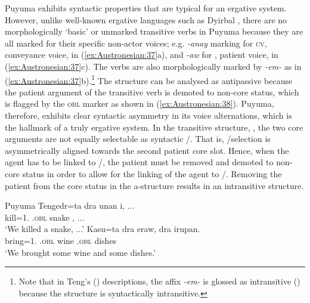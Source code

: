 \documentclass[output=paper,chinesefont]{../langscibook}
\begin{document}
Puyuma exhibits syntactic properties that are typical for an ergative system. However, unlike well-known ergative languages such as Dyirbal \citep{Dixon72}, there are no morphologically `basic' or unmarked transitive verbs in Puyuma because they are all marked for their specific non-actor voices; e.g. \emph{-anay} marking for \textsc{cv}, conveyance voice, in (\ref{ex:Austronesian:37}a), and \emph{-aw} for \PV, patient voice, in (\ref{ex:Austronesian:37}c). The \AV verbs are also morphologically marked by \emph{-em-} as in (\ref{ex:Austronesian:37}b).\footnote{Note that in Teng's (\citeyear{Teng2005,Teng2008}) descriptions, the \AV affix \emph{-em-} is glossed as intransitive (\INTR) because the \AV structure is syntactically intransitive.} The \AV structure can be analysed as antipassive because the patient argument of the transitive verb is demoted to non-core status, which is flagged by the \textsc{obl} marker as shown in (\ref{ex:Austronesian:38}). Puyuma, therefore, exhibits clear syntactic asymmetry in its voice alternations, which is the hallmark of a truly ergative system. In the transitive structure, , the two core arguments are not equally selectable as syntactic \SUBJ/\PIVOT. That is, \SUBJ/\PIVOT selection is asymmetrically aligned towards the second patient core slot. Hence, when the agent has to be linked to \SUBJ/\PIVOT, the patient must be removed and demoted to non-core status in order to allow for the linking of the agent to \SUBJ/\PIVOT. Removing the patient from the core status in the a-structure results in an intransitive \mbox{} structure.

\newpage
\ea\label{ex:Austronesian:38} Puyuma  \citep[72, 187]{Teng2008}
\ea\gll
Tengedr=ta dra unan i, ...\\
\textlangle{\AV}{\textrangle}kill=1\PL.{\NOM} \INDF.\textsc{obl} snake \TOPIC, ...\\
\glt`We killed a snake, ...'
\ex\gll
Kasu=ta dra eraw, dra irupan.\\
\textlangle{\AV}{\textrangle}bring=1\PL.{\NOM} \INDF.\textsc{obl} wine \INDF.\textsc{obl} dishes\\
\glt`We brought some wine and some dishes.'
\z\z
\end{document}
